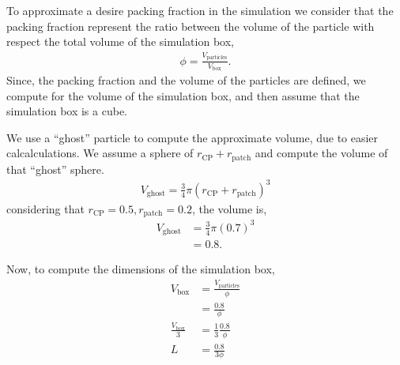 \documentclass[main.tex]{subfiles}
\begin{document}
To approximate a desire packing fraction in the simulation we consider that the packing fraction represent the ratio between the volume of the particle with respect the total volume of the simulation box,
\begin{gather*}
    \phi = \frac{V_{\mathrm{particles}}}{V_\mathrm{box}}.
\end{gather*}
Since, the packing fraction and the volume of the particles are defined, we compute for the volume of the simulation box, and then assume that the simulation box is a cube.

We use a ``ghost'' particle to compute the approximate volume, due to easier calcalculations.
We assume a sphere of $r_{\mathrm{CP}}+r_{\mathrm{patch}}$ and compute the volume of that ``ghost'' sphere.
\begin{gather*}
    V_{\mathrm{ghost}} = \frac{3}{4}\pi (r_{\mathrm{CP}}+r_{\mathrm{patch}})^{3}
\end{gather*}
considering that $r_{\mathrm{CP}}=0.5, r_{\mathrm{patch}}=0.2$, the volume is,
\begin{align*}
    V_{\mathrm{ghost}} &= \frac{3}{4}\pi (0.7)^{3} \\
                       &= 0.8.
\end{align*}

Now, to compute the dimensions of the simulation box,
\begin{align*}
    V_\mathrm{box} &= \frac{V_{\mathrm{particles}}}{\phi} \\
                   &= \frac{0.8}{\phi} \\
    \frac{V_\mathrm{box}}{3}&= \frac{1}{3}\frac{0.8}{\phi} \\
    L &= \frac{0.8}{3\phi}
\end{align*}
\end{document}
